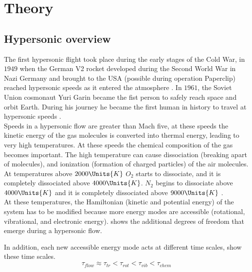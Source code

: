 \chapter{Theory\label{ch:chapter2}}

\section{Hypersonic overview\label{section:hypersonicOverview}}
        The first hypersonic flight took place during the early stages of the Cold War, in $1949$ when the German V2 rocket developed during the Second World War in Nazi Germany and brought to the USA (possible during operation Paperclip) reached hypersonic speeds as it entered the atmosphere \cite{Anderson2022}. In $1961$, the Soviet Union cosmonaut Yuri Garin became the fist person to safely reach space and orbit Earth. During his journey he became the first human in history to travel at hypersonic speeds \cite{Anderson2022}.\\

        Speeds in a hypersonic flow are greater than Mach five, at these speeds
        the kinetic energy of the gas molecules is converted into thermal
        energy, leading to very high temperatures. At these speeds the chemical
        composition of the gas becomes important. The high temperature can
        cause dissociation (breaking apart of molecules), and ionization
        (formation of charged particles) of the air molecules. At temperatures above $2000\Units{K}$ $O_2$ starts to dissociate, and
        it is completely dissociated above $4000\Units{K}$. $N_2$ begins to
        dissociate above $4000\Units{K}$ and it is completely
        dissociated above $9000\Units{K}$ \cite{Anderson2006}. \\ 

        At these temperatures, the Hamiltonian (kinetic and potential energy)
        of the system has to be modified because more energy modes are
        accessible (rotational, vibrational, and electronic energy).
         shows the additional degrees of freedom that
        emerge during a hypersonic flow. 


        In addition, each new accessible energy mode acts at different time scales,  show these time scales.
        \begin{equation}\label{timeScales}
            \tau_{flow} \approx \tau_{tr} < \tau_{rot} < \tau_{vib} < \tau_{chem} 
        \end{equation}

